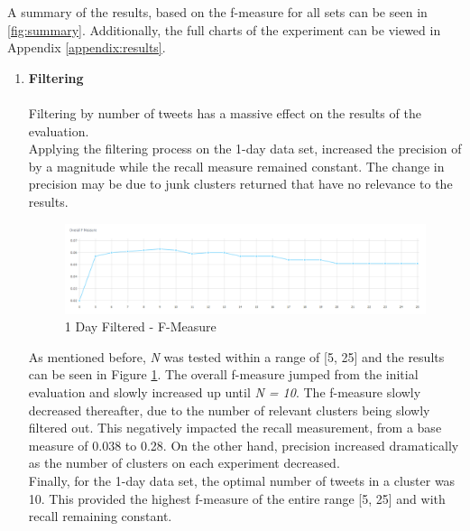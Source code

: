 \documentclass[a4paper,portrait,12pt]{article}
\begin{document}
A summary of the results, based on the f-measure for all sets can be seen in \ref{fig:summary}.
Additionally, the full charts of the experiment can be viewed in Appendix \ref{appendix:results}.

\begin{enumerate}
	\item \textbf{Filtering}\\
	\\
	      Filtering by number of tweets has a massive effect on the results of the evaluation. \\
	      Applying the filtering process on the 1-day data set, increased the precision of by a magnitude while the recall measure remained constant.
	      The change in precision may be due to junk clusters returned that have no relevance to the results.
	      \begin{figure}[h!]
		      \centering
		      \includegraphics[width=\linewidth]{images/1day-filtered-f-measure.png}
		      \caption{1 Day Filtered - F-Measure}
		      \label{fig:1day-filtered-f-measure}
	      \end{figure}

	      As mentioned before, \textit{N} was tested within a range of [5, 25] and the results can be seen in Figure \ref{fig:1day-filtered-f-measure}.
	      The overall f-measure jumped from the initial evaluation and slowly increased up until \textit{N = 10}.
	      The f-measure slowly decreased thereafter, due to the number of relevant clusters being slowly filtered out.
	      This negatively impacted the recall measurement, from a base measure of 0.038 to 0.28.
	      On the other hand, precision increased dramatically as the number of clusters on each experiment decreased.
	      \\
	      Finally, for the 1-day data set, the optimal number of tweets in a cluster was 10.
	      This provided the highest f-measure of the entire range [5, 25] and with recall remaining constant.


\end{enumerate}
\end{document}
